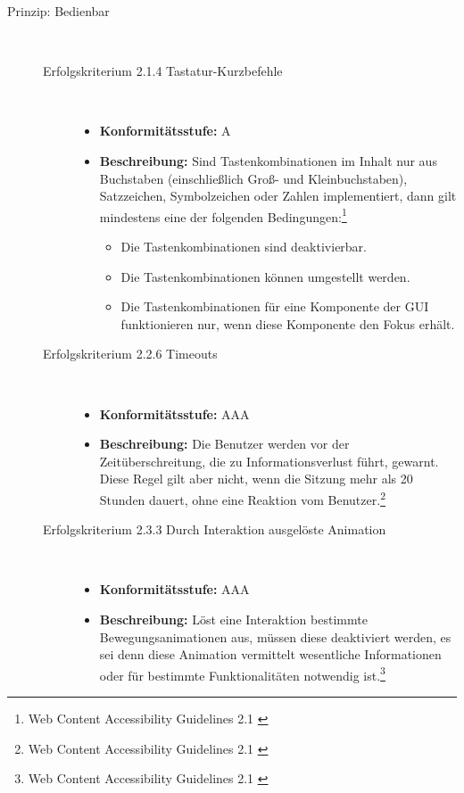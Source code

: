 \begin{description}
	\item[Prinzip: Bedienbar]\hfill \\
	\begin{description}
		\item [Erfolgskriterium 2.1.4 Tastatur-Kurzbefehle]\hfill \\
		\begin{itemize}
			\item \textbf{Konformitätsstufe:} A
			\item \textbf{Beschreibung:} Sind Tastenkombinationen im Inhalt nur aus Buchstaben (einschließlich Groß- und Kleinbuchstaben), Satzzeichen, Symbolzeichen oder Zahlen 
			implementiert, dann gilt mindestens eine der folgenden Bedingungen:\footnote{Web Content Accessibility Guidelines 2.1 \cite{WCAG2.1}}
			\begin{itemize}
				\item Die Tastenkombinationen sind deaktivierbar.
				\item Die Tastenkombinationen können umgestellt werden.
				\item Die Tastenkombinationen für eine Komponente der \ac{GUI} funktionieren nur, wenn diese Komponente den Fokus erhält.
			\end{itemize}
		\end{itemize}
		
		\item [Erfolgskriterium 2.2.6 Timeouts]\hfill \\
		\begin{itemize}
			\item \textbf{Konformitätsstufe:} AAA
			\item \textbf{Beschreibung:} Die Benutzer werden vor der Zeitüberschreitung, die zu Informationsverlust führt, gewarnt. Diese Regel gilt aber nicht, wenn die Sitzung mehr 
			als 20 Stunden dauert, ohne eine Reaktion vom Benutzer.\footnote{Web Content Accessibility Guidelines 2.1 \cite{WCAG2.1}}
		\end{itemize}
		
		\item [Erfolgskriterium 2.3.3 Durch Interaktion ausgelöste Animation]\hfill \\
		\begin{itemize}
			\item \textbf{Konformitätsstufe:} AAA
			\item \textbf{Beschreibung:} Löst eine Interaktion bestimmte Bewegungsanimationen aus, müssen diese deaktiviert werden, es sei denn diese Animation vermittelt 
			wesentliche Informationen oder für bestimmte Funktionalitäten notwendig ist.\footnote{Web Content Accessibility Guidelines 2.1 \cite{WCAG2.1}}
		\end{itemize}
		

\end{description}
\end{description}

